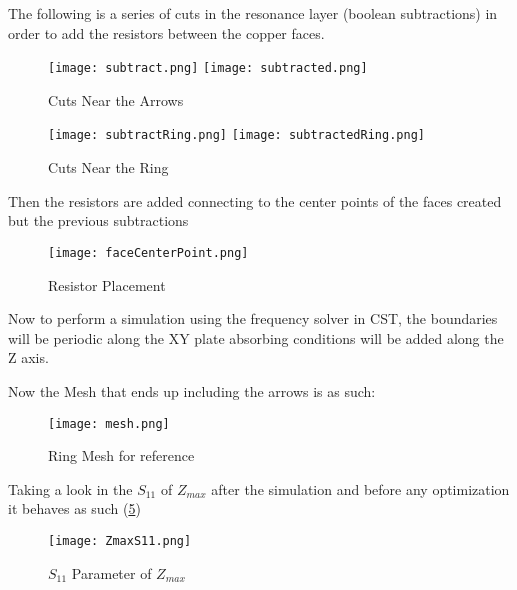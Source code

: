        The following is a series of cuts in the resonance layer (boolean subtractions)
        in order to add the resistors between the copper faces.
        \begin{figure}[h]
            \centering
            \texttt{[image: subtract.png]}\hfil
            \texttt{[image: subtracted.png]}
            \caption{Cuts Near the Arrows}
            \label{img:arrowCuts}
        \end{figure}

        \begin{figure}[h]
            \centering
            \texttt{[image: subtractRing.png]}\hfil
            \texttt{[image: subtractedRing.png]}
            \caption{Cuts Near the Ring}
            \label{img:ringCuts}
        \end{figure}

        Then the resistors are added connecting to the center points of the faces
        created but the previous subtractions
        \begin{figure}[h]
            \centering
            \texttt{[image: faceCenterPoint.png]}
            \caption{Resistor Placement}
            \label{img:resistors}
        \end{figure}

        Now to perform a simulation using the frequency solver in CST, the boundaries will be periodic
        along the XY plate absorbing conditions will be added along the Z axis.

        Now the Mesh that ends up including the arrows is as such:
        \begin{figure}[h]
            \centering
            \texttt{[image: mesh.png]}
            \caption{Ring Mesh for reference}
            \label{img:RingAndArrowMesh}
        \end{figure}

        Taking a look in the $S_{11}$ of $Z_{max}$ after the simulation and before any optimization
        it behaves as such (\ref{img:S11_Zmax})
        \begin{figure}[h]
            \centering
            \texttt{[image: ZmaxS11.png]}
            \caption{$S_{11}$ Parameter of $Z_{max}$}
            \label{img:S11_Zmax}
        \end{figure}
        



